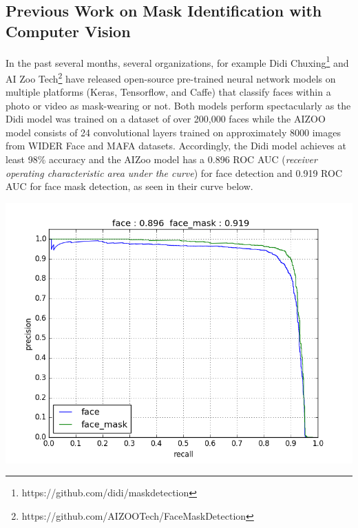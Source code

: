 \documentclass[conference, 12pt, onecolumn]{IEEEtran}
\begin{document}
\subsection{Previous Work on Mask Identification with Computer Vision}
In the past several months, several organizations, for example Didi Chuxing\footnote{https://github.com/didi/maskdetection} and AI Zoo Tech\footnote{https://github.com/AIZOOTech/FaceMaskDetection} have released open-source pre-trained neural network models on multiple platforms (Keras, Tensorflow, and Caffe) that classify faces within a photo or video as mask-wearing or not. Both models perform spectacularly as the Didi model was trained on a dataset of over 200,000 faces while the AIZOO model consists of 24 convolutional layers trained on approximately 8000 images from WIDER Face and MAFA datasets. Accordingly, the Didi model achieves at least 98\% accuracy and the AIZoo model has a 0.896 ROC AUC (\textit{receiver operating characteristic area under the curve}) for face detection and 0.919 ROC AUC for face mask detection, as seen in their curve below.
\begin{center}
\includegraphics[scale=.5]{pr_curve}
\end{center}


\end{document}

